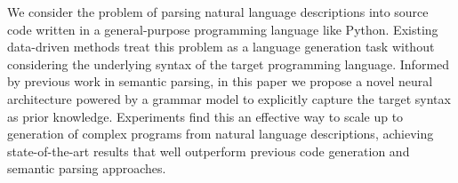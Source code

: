 We consider the problem of parsing natural language descriptions into source code written in a general-purpose programming language like Python. Existing data-driven methods treat this problem as a language generation task without considering the underlying syntax of the target programming language. Informed by previous work in semantic parsing, in this paper we propose a novel neural architecture powered by a grammar model to explicitly capture the target syntax as prior knowledge. Experiments find this an effective way to scale up to generation of complex programs from natural language descriptions, achieving state-of-the-art results that well outperform previous code generation and semantic parsing approaches.
